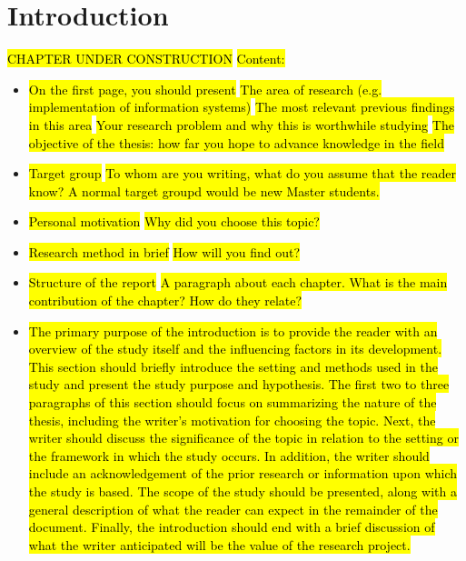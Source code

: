 \newpage
\chapter{Introduction}
\hl{CHAPTER UNDER CONSTRUCTION}
\iffalse
    \hl{Content:}
    \begin{itemize}
        \item \hl{On the first page, you should present}
            \subitem \hl{The area of research (e.g. implementation of information systems)}
            \subitem \hl{The most relevant previous findings in this area}
            \subitem \hl{Your research problem and why this is worthwhile studying}
            \subitem \hl{The objective of the thesis: how far you hope to advance knowledge in the field}
        \item \hl{Target group}
            \subitem \hl{To whom are you writing, what do you assume that the reader know? A normal target groupd would be new Master students.}
        \item \hl{Personal motivation}
            \subitem \hl{Why did you choose this topic?}
        \item \hl{Research method in brief}
            \subitem \hl{How will you find out?}
        \item \hl{Structure of the report}
            \subitem \hl{A paragraph about each chapter. What is the main contribution of the chapter? How do they relate?}
    \end{itemize}
    
    \begin{itemize}
        \item \hl{The primary purpose of the introduction is to provide the reader with an overview of the study itself and the influencing factors in its development. This section should briefly introduce the setting and methods used in the study and present the study purpose and hypothesis. The first two to three paragraphs of this section should focus on summarizing the nature of the thesis, including the writer's motivation for choosing the topic. Next, the writer should discuss the significance of the topic in relation to the setting or the framework in which the study occurs. In addition, the writer should include an acknowledgement of the prior research or information upon which the study is based. The scope of the study should be presented, along with a general description of what the reader can expect in the remainder of the document. Finally, the introduction should end with a brief discussion of what the writer anticipated will be the value of the research project. }
    \end{itemize}
    
